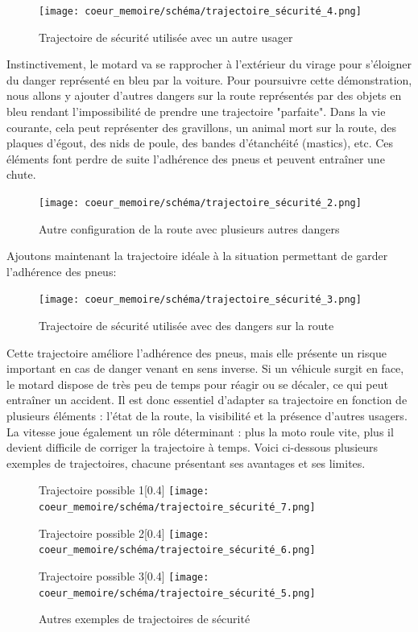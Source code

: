 \begin{figure}[H]
    \centering
    \texttt{[image: coeur\_memoire/schéma/trajectoire\_sécurité\_4.png]} 
    \caption{Trajectoire de sécurité utilisée avec un autre usager}
\end{figure}
Instinctivement, le motard va se rapprocher à l'extérieur du virage pour s'éloigner du danger représenté en bleu par la voiture.
Pour poursuivre cette démonstration, nous allons y ajouter d'autres dangers sur la route représentés par des objets en bleu rendant l'impossibilité de prendre une trajectoire "parfaite". Dans la vie courante, cela peut représenter des gravillons, un animal mort sur la route, des plaques d'égout, des nids de poule, des bandes d'étanchéité (mastics), etc. Ces éléments font perdre de suite l'adhérence des pneus et peuvent entraîner une chute. 
\begin{figure}[H]
    \centering
    \texttt{[image: coeur\_memoire/schéma/trajectoire\_sécurité\_2.png]} 
    \caption{Autre configuration de la route avec plusieurs autres dangers}
\end{figure}
Ajoutons maintenant la trajectoire idéale à la situation permettant de garder l'adhérence des pneus:
\begin{figure}[H]
    \centering
    \texttt{[image: coeur\_memoire/schéma/trajectoire\_sécurité\_3.png]} 
    \caption{Trajectoire de sécurité utilisée avec des dangers sur la route}
    \label{fig:trajectoire_securite_difficulte}
\end{figure}
Cette trajectoire améliore l’adhérence des pneus, mais elle présente un risque important en cas de danger venant en sens inverse. Si un véhicule surgit en face, le motard dispose de très peu de temps pour réagir ou se décaler, ce qui peut entraîner un accident. Il est donc essentiel d’adapter sa trajectoire en fonction de plusieurs éléments : l’état de la route, la visibilité et la présence d’autres usagers. La vitesse joue également un rôle déterminant : plus la moto roule vite, plus il devient difficile de corriger la trajectoire à temps. Voici ci-dessous plusieurs exemples de trajectoires, chacune présentant ses avantages et ses limites.
\begin{figure}[H]
  \centering
  \begin{subcaptionbox}{Trajectoire possible 1}[0.4\linewidth]
    {\texttt{[image: coeur\_memoire/schéma/trajectoire\_sécurité\_7.png]}}
  \end{subcaptionbox}
  \hfill
  \begin{subcaptionbox}{Trajectoire possible 2}[0.4\linewidth]
    {\texttt{[image: coeur\_memoire/schéma/trajectoire\_sécurité\_6.png]}}
  \end{subcaptionbox}
  
  \vspace{0.5cm}
  
  \begin{subcaptionbox}{Trajectoire possible 3}[0.4\linewidth]
    {\texttt{[image: coeur\_memoire/schéma/trajectoire\_sécurité\_5.png]}}

  \end{subcaptionbox}

  \caption{Autres exemples de trajectoires de sécurité}
\end{figure}

